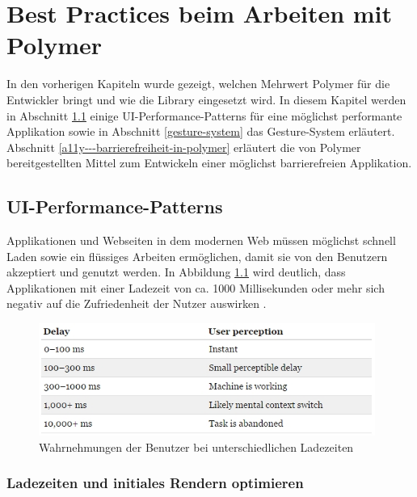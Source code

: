 \chapter{Best Practices beim Arbeiten mit Polymer}\label{best-practices-beim-arbeiten-mit-polymer}

In den vorherigen Kapiteln wurde gezeigt, welchen Mehrwert Polymer für die Entwickler bringt und wie die Library eingesetzt wird. In diesem Kapitel werden in Abschnitt \ref{ui-performance-patterns} einige \ac{UI}-Performance-Patterns für eine möglichst performante Applikation sowie in Abschnitt \ref{gesture-system} das Gesture-System erläutert. Abschnitt \ref{a11y---barrierefreiheit-in-polymer} erläutert die von Polymer bereitgestellten Mittel zum Entwickeln einer möglichst barrierefreien Applikation.


\section{UI-Performance-Patterns}\label{ui-performance-patterns}

Applikationen und Webseiten in dem modernen Web müssen möglichst schnell Laden sowie ein flüssiges Arbeiten ermöglichen, damit sie von den Benutzern akzeptiert und genutzt werden. In Abbildung \ref{fig:vwdbbul} wird deutlich, dass Applikationen mit einer Ladezeit von ca. 1000 Millisekunden oder mehr sich negativ auf die Zufriedenheit der Nutzer auswirken \cite{citeulike:13262776}.

\begin{figure}[htbp]
 \centering
 \includegraphics[width=11cm,keepaspectratio]{kapitel6/bilder/1-performance-user-perception-reaction-times}
 \caption{Wahrnehmungen der Benutzer bei unterschiedlichen Ladezeiten}
 \label{fig:vwdbbul}
\end{figure}


\subsection{Ladezeiten und initiales Rendern optimieren}\label{ladezeiten-und-initiales-rendern-optimieren}

